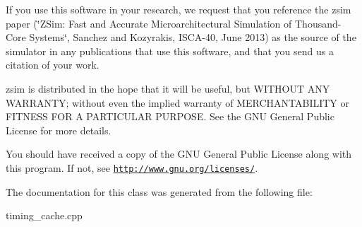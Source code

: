 If you use this software in your research, we request that you reference the zsim paper (\char`\"{}\-Z\-Sim\-: Fast and Accurate Microarchitectural Simulation of
\-Thousand-\/\-Core Systems\char`\"{}, Sanchez and Kozyrakis, I\-S\-C\-A-\/40, June 2013) as the source of the simulator in any publications that use this software, and that you send us a citation of your work.

zsim is distributed in the hope that it will be useful, but W\-I\-T\-H\-O\-U\-T A\-N\-Y W\-A\-R\-R\-A\-N\-T\-Y; without even the implied warranty of M\-E\-R\-C\-H\-A\-N\-T\-A\-B\-I\-L\-I\-T\-Y or F\-I\-T\-N\-E\-S\-S F\-O\-R A P\-A\-R\-T\-I\-C\-U\-L\-A\-R P\-U\-R\-P\-O\-S\-E. See the G\-N\-U General Public License for more details.

You should have received a copy of the G\-N\-U General Public License along with this program. If not, see \href{http://www.gnu.org/licenses/}{\tt http\-://www.\-gnu.\-org/licenses/}. 

The documentation for this class was generated from the following file\-:\begin{DoxyCompactItemize}
\item 
timing\-\_\-cache.\-cpp\end{DoxyCompactItemize}
